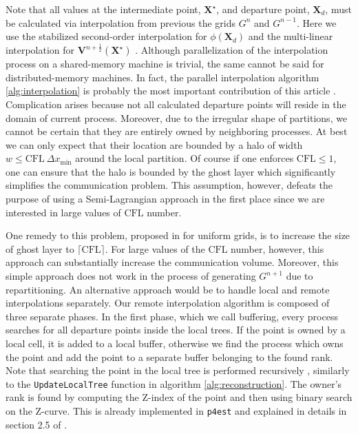 Note that all values at the intermediate point, $\mathbf{X}^\star$, and departure point, $\mathbf{X}_d$, must be calculated via interpolation from previous the grids $G^{n}$ and $G^{n-1}$. Here we use the stabilized second-order interpolation for $\phi(\mathbf{X}_d)$ and the multi-linear interpolation for $\mathbf{V}^{n+\frac{1}{2}}(\mathbf{X}^\star)$ \cite{Min;Gibou:07:A-second-order-accur}. Although parallelization of the interpolation process on a shared-memory machine is trivial, the same cannot be said for distributed-memory machines. In fact, the parallel interpolation algorithm \ref{alg:interpolation} is probably the most important contribution of this article . Complication arises because not all calculated departure points will reside in the domain of current process. Moreover, due to the irregular shape of partitions, we cannot be certain that they are entirely owned by neighboring processes. At best we can only expect that their location are bounded by a halo of width $w \le \text{CFL} \: \Delta x_{\min}$ around the local partition. Of course if one enforces $\text{CFL} \le 1$, one can ensure that the halo is bounded by the ghost layer which significantly simplifies the communication problem. This assumption, however, defeats the purpose of using a Semi-Lagrangian approach in the first place since we are interested in large values of $\text{CFL}$ number.

One remedy to this problem, proposed in \cite{Thomas;Cote:95:Massively-parallel-s} for uniform grids, is to increase the size of ghost layer to $\lceil \text{CFL} \rceil$. For large values of the $\text{CFL}$ number, however, this approach can substantially increase the communication volume. Moreover, this simple approach does not work in the process of generating $G^{n+1}$ due to repartitioning. An alternative approach would be to handle local and remote interpolations separately. Our remote interpolation algorithm is composed of three separate phases. In the first phase, which we call buffering, every process searches for all departure points inside the local trees. If the point is owned by a local cell, it is added to a local buffer, otherwise we find the process which owns the point and add the point to a separate buffer belonging to the found rank. Note that searching the point in the local tree is performed recursively , similarly to the \texttt{UpdateLocalTree} function in algorithm \ref{alg:reconstruction}. The owner's rank is found by computing the Z-index of the point and then using binary search on the Z-curve. This is already implemented in \texttt{p4est} and explained in details in section 2.5 of \cite{Burstedde;Wilcox;Ghattas:11:p4est:-Scalable-Algo}.

